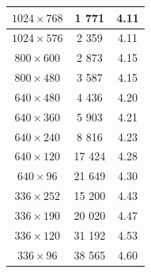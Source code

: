 \begin{table}[h]
\begin{tabular}{ccc}
		$1024\times768$     & 1 771                                                         & 4.11                                                                              \\ \hline
		$1024\times576$     & 2 359                                                         & 4.11                                                                              \\
		$800\times600$      & 2 873                                                         & 4.15                                                                              \\
		$800\times480$      & 3 587                                                         & 4.15                                                                              \\
		$640\times480$      & 4 436                                                         & 4.20                                                                              \\ \hline
		$640\times360$      & 5 903                                                         & 4.21                                                                              \\
		$640\times240$      & 8 816                                                         & 4.23                                                                              \\
		$640\times120$      & 17 424                                                        & 4.28                                                                              \\
		$640\times96$       & 21 649                                                        & 4.30                                                                              \\ \hline
		$336\times252$      & 15 200                                                        & 4.43                                                                              \\
		$336\times190$      & 20 020                                                        & 4.47                                                                              \\
		$336\times120$      & 31 192                                                        & 4.53                                                                              \\
		$336\times96$       & 38 565                                                        & 4.60                                                                             
	\end{tabular}
\label{tab:7.1}
\end{table}
